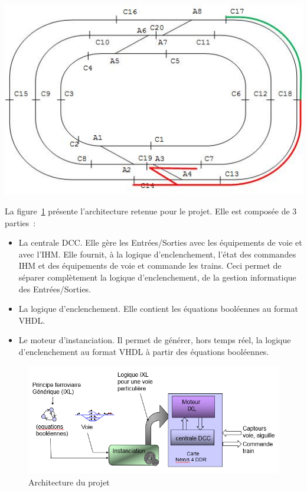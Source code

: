 \begin{center}
\includegraphics[scale=0.6]{zone_approche.jpg}
\label{encl_approche}%
\end{center}

\newpage
  
La figure~\ref{archi} présente l'architecture retenue pour le
projet. Elle est composée de 3 parties~:
  \begin{itemize}
    \item La centrale DCC. Elle gère les Entrées/Sorties avec les
      équipements de voie et avec l'IHM. Elle fournit, à la logique
      d'enclenchement, l'état des commandes IHM et des équipements de
      voie et commande les trains. Ceci permet de séparer complètement
      la logique d'enclenchement, de la gestion informatique des
      Entrées/Sorties.
    \item La logique d'enclenchement. Elle contient les équations
      booléennes au format VHDL. 
    \item Le moteur d'instanciation. Il permet de générer, hors temps réel,
      la logique d'enclenchement au format VHDL à partir des équations
      booléennes.
  \end{itemize}

\begin{figure}[ht]
\centering
\includegraphics[scale=0.45]{moteur.png}
\caption{Architecture du projet}
\label{archi}
\end{figure}

